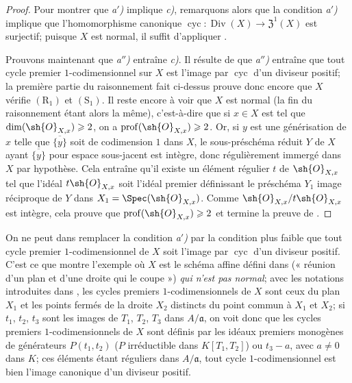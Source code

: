 \begin{proof}
Pour montrer que \emph{a$'$)} implique \emph{c)}, remarquons alors que la condition \emph{a$'$)} implique que l'homomorphisme canonique $\operatorname{cyc}:\operatorname{Div}(X)\to\mathfrak{Z}^1(X)$ est surjectif;
puisque $X$ est normal, il suffit d'appliquer .

Prouvons maintenant que \emph{a$''$)} entraîne \emph{c)}.
Il résulte de  que \emph{a$''$)} entraîne que tout cycle premier $1$-codimensionnel sur $X$ est l'image par $\operatorname{cyc}$ d'un diviseur positif;
la première partie du raisonnement fait ci-dessus prouve donc encore que $X$ vérifie $(\mathrm{R}_1)$ et $(\mathrm{S}_1)$.
Il reste encore à voir que $X$ est normal (la fin du raisonnement étant alors la même), c'est-à-dire que si $x\in X$ est tel que $\dim(\sh{O}_{X,x})\geq2$, on a $\operatorname{prof}(\sh{O}_{X,x})\geq2$.
Or, si $y$ est une générisation de $x$ telle que $\overline{\{y\}}$ soit de codimension $1$ dans $X$, le sous-préschéma réduit $Y$ de $X$ ayant $\overline{\{y\}}$ pour espace
sous-jacent est intègre, donc régulièrement immergé dans $X$ par hypothèse.
Cela entraîne qu'il existe un élément régulier $t$ de $\sh{O}_{X,x}$ tel que l'idéal $t\sh{O}_{X,x}$ soit l'idéal premier définissant le préschéma $Y_1$ image réciproque de $Y$ dans $X_1=\Spec(\sh{O}_{X,x})$.
Comme $\sh{O}_{X,x}/t\sh{O}_{X,x}$ est intègre, cela prouve que $\operatorname{prof}(\sh{O}_{X,x})\geq2$ et termine la preuve de .
\end{proof}

\begin{remark}[21.7.5]
\label{IV.21.7.5}
On ne peut dans  remplacer la condition \emph{a$'$)} par la condition plus faible que tout cycle premier $1$-codimensionnel de $X$ soit l'image par $\operatorname{cyc}$ d'un diviseur positif.
C'est ce que montre l'exemple où $X$ est le schéma affine défini dans  (« réunion d'un plan et d'une droite qui le coupe ») \emph{qui n'est pas normal};
avec les notations introduites dans , les cycles premiers $1$-codimensionnels de $X$ sont ceux du plan $X_1$ et les points fermés de la droite $X_2$ distincts du point commun à $X_1$ et $X_2$;
si $t_1$, $t_2$, $t_3$ sont les images de $T_1$, $T_2$, $T_3$ dans $A/\mathfrak a$, on voit donc que les cycles premiers $1$-codimensionnels de $X$ sont définis par les idéaux premiers monogènes de générateurs $P(t_1,t_2)$ ($P$ irréductible dans $K[T_1,T_2]$) ou $t_3-a$, avec $a\neq0$ dans $K$;
ces éléments étant réguliers dans $A/\mathfrak a$, tout cycle $1$-codimensionnel est bien l'image canonique d'un diviseur positif.
\end{remark}

